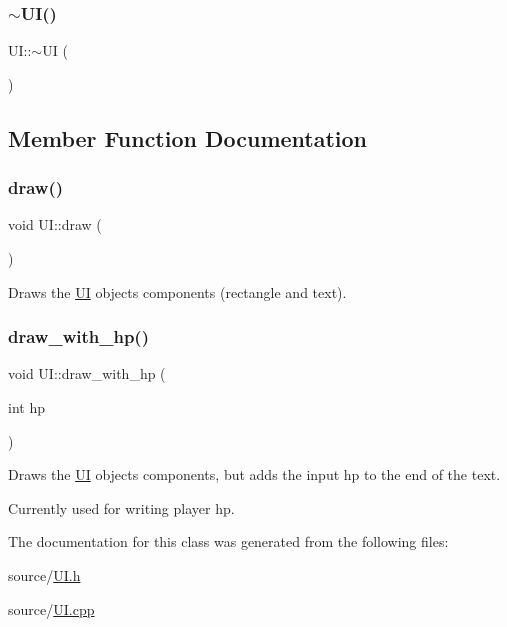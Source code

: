 \mbox{\label{classUI_a1b23d0c64c7cbb3d143d90ec532a7ccd}} 
\subsubsection{\texorpdfstring{$\sim$\+U\+I()}{~UI()}}
{\footnotesize\ttfamily U\+I\+::$\sim$\+UI (\begin{DoxyParamCaption}{ }\end{DoxyParamCaption})}



\subsection{Member Function Documentation}
\mbox{\label{classUI_a11a5b60d8f59c41b6d1acf9d153eaafa}} 
\subsubsection{\texorpdfstring{draw()}{draw()}}
{\footnotesize\ttfamily void U\+I\+::draw (\begin{DoxyParamCaption}{ }\end{DoxyParamCaption})}

Draws the \hyperlink{classUI}{UI} objects components (rectangle and text). \mbox{\label{classUI_a99c8d122817b176f2dcec5589d64c008}} 
\subsubsection{\texorpdfstring{draw\+\_\+with\+\_\+hp()}{draw\_with\_hp()}}
{\footnotesize\ttfamily void U\+I\+::draw\+\_\+with\+\_\+hp (\begin{DoxyParamCaption}\item[{int}]{hp }\end{DoxyParamCaption})}

Draws the \hyperlink{classUI}{UI} objects components, but adds the input hp to the end of the text.

Currently used for writing player hp. 

The documentation for this class was generated from the following files\+:\begin{DoxyCompactItemize}
\item 
source/\hyperlink{UI_8h}{U\+I.\+h}\item 
source/\hyperlink{UI_8cpp}{U\+I.\+cpp}\end{DoxyCompactItemize}
